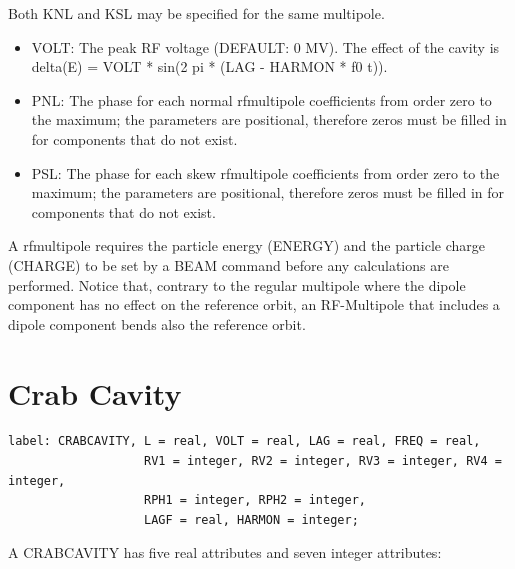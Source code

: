 Both KNL and KSL may be specified for the same multipole.  


\begin{itemize}
   \item VOLT: The peak RF voltage (DEFAULT: 0 MV). The effect of the
     cavity is \\ 
     delta(E) = VOLT * sin(2 pi * (LAG - HARMON * f0 t)). 
   \item PNL: The phase for each normal rfmultipole coefficients from
     order zero to the maximum; the parameters are positional,
     therefore zeros must be filled in for components that do not
     exist.  
   \item PSL: The phase for each skew rfmultipole coefficients from
     order zero to the maximum; the parameters are positional,
     therefore zeros must be filled in for components that do not
     exist.  
\end{itemize}       

A rfmultipole requires the particle energy (ENERGY) and the
particle charge (CHARGE) to be set by a BEAM command before any
calculations are performed. Notice that, contrary to the regular
multipole where the dipole component has no effect on the
reference orbit, an RF-Multipole that includes a dipole component
bends also the reference orbit.      



%
\section{Crab Cavity}
\label{sec:crab_cavity}

\begin{verbatim}
label: CRABCAVITY, L = real, VOLT = real, LAG = real, FREQ = real,
                   RV1 = integer, RV2 = integer, RV3 = integer, RV4 = integer, 
                   RPH1 = integer, RPH2 = integer, 
                   LAGF = real, HARMON = integer;                 
\end{verbatim} 


A CRABCAVITY has five real attributes and seven integer attributes: 

